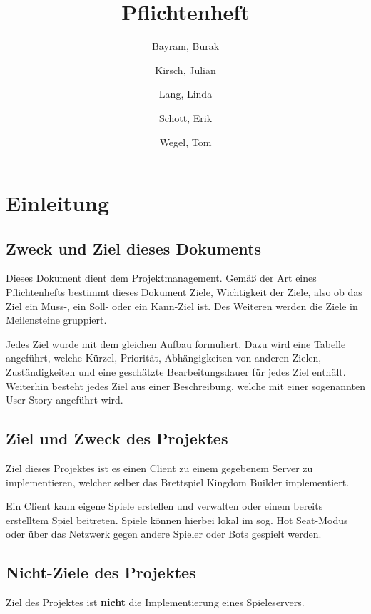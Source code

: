 \documentclass[a4paper]{scrreprt}
\begin{document}
\title{Pflichtenheft}
\author{
	Bayram, Burak
	\and
	Kirsch, Julian
	\and
	Lang, Linda
	\and
	Schott, Erik
	\and
	Wegel, Tom
}
\maketitle

\newpage

\tableofcontents
\newpage

\chapter{Einleitung}
\section{Zweck und Ziel dieses Dokuments}

Dieses Dokument dient dem Projektmanagement. Gemäß der Art eines Pflichtenhefts bestimmt dieses Dokument Ziele, Wichtigkeit der Ziele, also ob das Ziel ein Muss-, ein Soll- oder ein Kann-Ziel ist. Des Weiteren werden die Ziele in Meilensteine gruppiert.

Jedes Ziel wurde mit dem gleichen Aufbau formuliert. Dazu wird eine Tabelle angeführt, welche Kürzel, Priorität, Abhängigkeiten von anderen Zielen, Zuständigkeiten und eine geschätzte Bearbeitungsdauer für jedes Ziel enthält.
Weiterhin besteht jedes Ziel aus einer Beschreibung, welche mit einer sogenannten User Story angeführt wird.


\section{Ziel und Zweck des Projektes}

Ziel dieses Projektes ist es einen Client zu einem gegebenem Server zu implementieren, welcher selber das Brettspiel \glqq Kingdom Builder\grqq{} implementiert.

Ein Client kann eigene Spiele erstellen und verwalten oder einem bereits erstelltem Spiel beitreten. Spiele können hierbei lokal im sog. \glqq Hot Seat\grqq{}-Modus
oder über das Netzwerk gegen andere Spieler oder Bots gespielt werden.

\section{Nicht-Ziele des Projektes}

Ziel des Projektes ist \textbf{nicht} die Implementierung eines Spieleservers.
\end{document}
